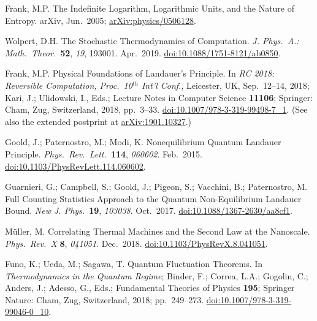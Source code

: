 \documentclass[preprints,article,accept,moreauthors,pdftex]{Definitions/mdpi}
\begin{document}
\begin{thebibliography}{999}
Frank, M.P\@. The Indefinite Logarithm, Logarithmic Units, and the Nature of Entropy. arXiv, Jun.\ 2005; \href{https://arxiv.org/abs/physics/0506128}{arXiv:physics/0506128}.

Wolpert, D.H\@. The Stochastic Thermodynamics of Computation. {\em J. Phys.\ A.: Math.\ Theor.}\ {\bf 52}, {\em 19}, 193001. Apr.\ 2019. \href{https://doi.org/10.1088/1751-8121/ab0850}{doi:10.1088/1751-8121/ab0850}.

Frank, M.P\@. Physical Foundations of Landauer's Principle. In \emph{RC 2018: Reversible Computation, Proc.\ 10$^{th}$ Int'l Conf.}, Leicester, UK, Sep.\ 12--14, 2018; Kari, J.; Ulidowski, I., Eds.; Lecture Notes in Computer Science {\bf 11106}; Springer: Cham, Zug, Switzerland, 2018, pp.~3--33. \href{https://doi.org/10.1007/978-3-319-99498-7_1}{doi:10.1007/978-3-319-99498-7\_1}. (See also the extended postprint at \href{https://arxiv.org/abs/1901.10327}{arXiv:1901.10327}.)

Goold, J.; Paternostro, M.; Modi, K\@. Nonequilibrium Quantum Landauer Principle. {\em Phys.\ Rev.\ Lett.}\ {\bf 114}, {\em 060602}. Feb.\ 2015. \href{https://doi.org/10.1103/PhysRevLett.114.060602}{doi:10.1103/PhysRevLett.114.060602}.

Guarnieri, G.; Campbell, S.; Goold, J.; Pigeon, S.; Vacchini, B.; Paternostro, M\@. Full Counting Statistics Approach to the Quantum Non-Equilibrium Landauer Bound. {\em New J. Phys.}\ {\bf 19}, {\em 103038}. Oct.\ 2017. \href{https://doi.org/10.1088/1367-2630/aa8cf1}{doi:10.1088/1367-2630/aa8cf1}.

Müller, M\@. Correlating Thermal Machines and the Second Law at the Nanoscale. {\em Phys.\ Rev.\ X} {\bf 8}, {\em 041051}. Dec.\ 2018. \href{https://doi.org/10.1103/PhysRevX.8.041051}{doi:10.1103/PhysRevX.8.041051}.

Funo, K.; Ueda, M.; Sagawa, T\@. Quantum Fluctuation Theorems. In \emph{Thermodynamics in the Quantum Regime}; Binder, F.; Correa, L.A.; Gogolin, C.; Anders, J.; Adesso, G., Eds.; Fundamental Theories of Physics {\bf 195}; Springer Nature: Cham, Zug, Switzerland, 2018; pp.~249--273. \href{https://doi.org/10.1007/978-3-319-99046-0_10}{doi:10.1007/978-3-319-99046-0\_10}.


\end{thebibliography}
\end{document}

